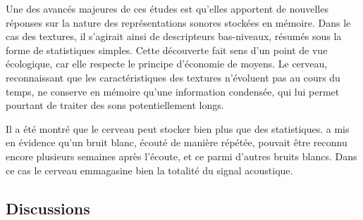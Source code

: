 Une des avancés majeures de ces études est qu'elles apportent de nouvelles réponses sur la nature des représentations sonores stockées en mémoire. Dans le cas des textures, il s'agirait ainsi de descripteurs bas-niveaux, résumés sous la forme de statistiques simples. Cette découverte fait sens d'un point de vue écologique, car elle respecte le principe d'économie de moyens. Le cerveau, reconnaissant que les caractéristiques des textures n'évoluent pas au cours du temps, ne conserve en mémoire qu'une information condensée, qui lui permet pourtant de traiter des sons potentiellement longs. 

Il a été montré que le cerveau peut stocker bien plus que des statistiques. \citep{agus2010rapid} a mis en évidence qu'un bruit blanc, écouté de manière répétée, pouvait être reconnu encore plusieurs semaines après l'écoute, et ce parmi d'autres bruits blancs. Dans ce cas le cerveau emmagasine bien la totalité du signal acoustique.

\subsection{Discussions}
\label{sec:ch3_textureDiscussion}



